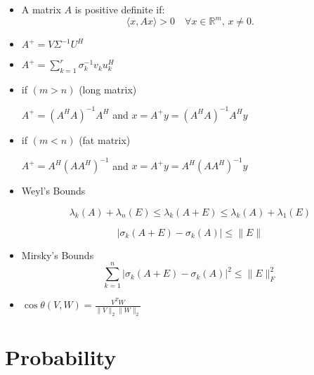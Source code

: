 \documentclass{article}
\begin{document}
\begin{itemize}
 \item A matrix $A$ is positive definite if:
        \[
        \langle x, Ax \rangle > 0 \quad \forall x \in \mathbb{R}^m, \, x \neq 0.
        \]



\item 
   $
    A^+ = V \Sigma^{-1} U^H
   $


\item 
$
A^+ = \sum_{k=1}^{r} \sigma_k^{-1} v_k u_k^H
$


\item if $(m > n)$ (long matrix)

    $
    A^+ = (A^H A)^{-1} A^H
    $ and $x = A^+y = (A^H A)^{-1} A^Hy$

\item if $(m < n)$ (fat matrix)

$
 A^+ = A^H(AA^H)^{-1}
$ and $x = A^+y = A^H(AA^H)^{-1}y$

\item Weyl's Bounds

\[
\lambda_k(A) + \lambda_n(E) \leq \lambda_k(A + E) \leq \lambda_k(A) + \lambda_1(E)
\]

\[
\lvert \sigma_k(A + E) - \sigma_k(A) \rvert \leq \lVert E \rVert
\]


\item Mirsky's Bounds
\[
\sum_{k=1}^{n} \lvert \sigma_k(A + E) - \sigma_k(A) \rvert^2 \leq \lVert E \rVert_F^2
\]

\item   $
    \cos \theta(V,W) = \frac{V^T W}{\lVert V \rVert_2 \lVert W \rVert_2}
    $

\end{itemize}


\section{Probability}
\end{document}

